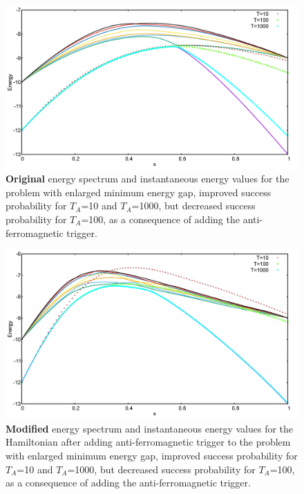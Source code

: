 \documentclass[../main.tex]{subfiles}
\begin{document}
\begin{figure}[H]
\centering 
\includegraphics[scale=0.3]{705_O_T.png}
\caption{\textbf{Original} energy spectrum and instantaneous energy values for the problem with enlarged minimum energy gap, improved success probability for $T_A$=10 and $T_A$=1000, but decreased success probability for $T_A$=100, as a consequence of adding the anti-ferromagnetic trigger. }
\label{fig:a24}
\end{figure}
\begin{figure}[H]
\centering 
\includegraphics[scale=0.3]{705_A_T_g1.png}
\caption{\textbf{Modified} energy spectrum and instantaneous energy values for the Hamiltonian after adding anti-ferromagnetic trigger to the problem with enlarged minimum energy gap, improved success probability for $T_A$=10 and $T_A$=1000, but decreased success probability for $T_A$=100, as a consequence of adding the anti-ferromagnetic trigger.}
\label{fig:a25}
\end{figure}
\end{document}
